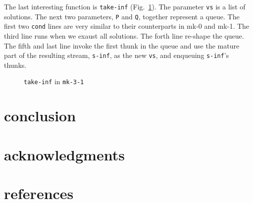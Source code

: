 \documentclass[format=acmlarge, review=true, authordraft=true]{acmart}
\begin{document}
The last interesting function is \texttt{take-inf} (Fig.~\ref{take-inf-3-1}). 
The parameter \texttt{vs} is a list of solutions. The next two parameters, 
\texttt{P} and \texttt{Q}, together represent a queue. The first two 
\texttt{cond} lines are very similar to their counterparts in mk-0 and mk-1. 
The third line runs when we exaust all solutions. The forth line re-shape the 
queue. The fifth and last line invoke the first thunk in the queue and use the 
mature part of the resulting stream, \texttt{s-inf}, as the new \texttt{vs}, 
and enqueuing \texttt{s-inf}'s thunks.

\begin{figure}
	 	
	 \caption{\texttt{take-inf} in \texttt{mk-3-1}}
	 \label{take-inf-3-1}
\end{figure}



\section{conclusion}

\section*{acknowledgments}

\section*{references}
\end{document}
